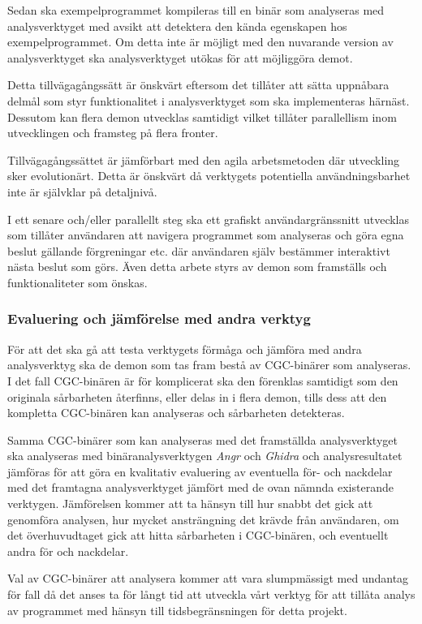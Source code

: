 Sedan ska exempelprogrammet kompileras till en binär som analyseras med
analysverktyget med avsikt att detektera den kända egenskapen hos
exempelprogrammet. Om detta inte är möjligt med den nuvarande version av
analysverktyget ska analysverktyget utökas för att möjliggöra demot.

Detta tillvägagångssätt är önskvärt eftersom det tillåter att sätta uppnåbara
delmål som styr funktionalitet i analysverktyget som ska implementeras härnäst.
Dessutom kan flera demon utvecklas samtidigt vilket tillåter parallellism inom
utvecklingen och framsteg på flera fronter.

Tillvägagångssättet är jämförbart med den agila arbetsmetoden där utveckling sker 
evolutionärt. Detta är önskvärt då verktygets potentiella 
användningsbarhet inte är självklar på detaljnivå.

I ett senare och/eller parallellt steg ska ett grafiskt användargränssnitt
utvecklas som tillåter användaren att navigera programmet som analyseras och
göra egna beslut gällande förgreningar etc. där användaren själv bestämmer
interaktivt nästa beslut som görs. Även detta arbete styrs av demon som
framställs och funktionaliteter som önskas.

\subsubsection{Evaluering och jämförelse med andra verktyg}

För att det ska gå att testa verktygets förmåga och jämföra med andra
analysverktyg ska de demon som tas fram bestå av CGC-binärer som analyseras. I
det fall CGC-binären är för komplicerat ska den förenklas samtidigt som den
originala sårbarheten återfinns, eller delas in i flera demon, tills dess att
den kompletta CGC-binären kan analyseras och sårbarheten detekteras.

Samma CGC-binärer som kan analyseras med det framställda analysverktyget ska
analyseras med binäranalysverktygen \emph{Angr} och \emph{Ghidra} och
analysresultatet jämföras för att göra en kvalitativ evaluering av eventuella
för- och nackdelar med det framtagna analysverktyget jämfört med de ovan nämnda
existerande verktygen. Jämförelsen kommer att ta hänsyn till hur snabbt det
gick att genomföra analysen, hur mycket ansträngning det krävde från
användaren, om det överhuvudtaget gick att hitta sårbarheten i CGC-binären, och
eventuellt andra för och nackdelar.

Val av CGC-binärer att analysera kommer att vara slumpmässigt med undantag för
fall då det anses ta för långt tid att utveckla vårt verktyg för att tillåta
analys av programmet med hänsyn till tidsbegränsningen för detta projekt.
